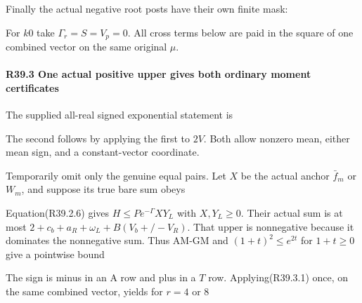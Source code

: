 Finally the actual negative root posts have their own finite mask:


For \(k0\) take \(\Gamma_r=S=V_p=0\).  All cross terms below are paid in the square of one combined vector on the same original \(\mu\).

\paragraph{R39.3 One actual positive upper gives both ordinary moment certificates}

The supplied all-real signed exponential statement is


The second follows by applying the first to \(2V\). Both allow nonzero mean, either mean sign, and a constant-vector coordinate.

Temporarily omit only the genuine equal pairs. Let \(X\) be the actual anchor \(\bar f_m\) or \(W_m\), and suppose its true bare sum obeys


Equation(R39.2.6) gives \(H\le P e^{-\Gamma} X Y_L\) with \(X,\allowbreak \allowbreak Y_L\ge 0\). Their actual sum is at most \(2+c_b+a_R+\omega_L+B(V_b+/-V_R)\). That upper is nonnegative because it dominates the nonnegative sum. Thus AM-GM and \((1+t)^2\le e^{2t}\) for \(1+t\ge 0\) give a pointwise bound


The sign is minus in an A row and plus in a \(T\) row. Applying(R39.3.1) once, on the same combined vector, yields for \(r=4\) or 8


